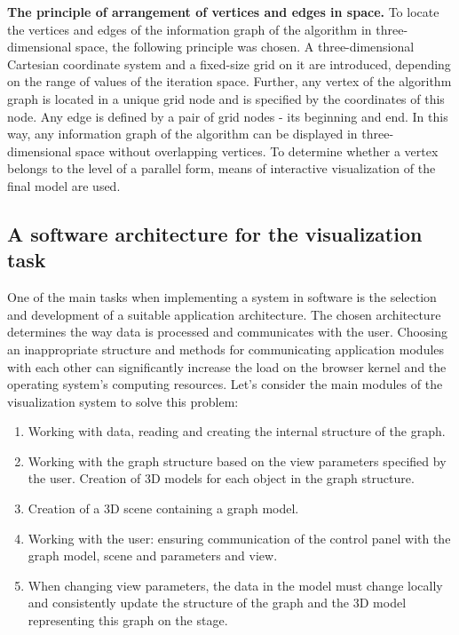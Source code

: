 \textbf{The principle of arrangement of vertices and edges in space.} To locate the vertices and edges of the information graph of the algorithm in three-dimensional space, the following principle was chosen. A three-dimensional Cartesian coordinate system and a fixed-size grid on it are introduced, depending on the range of values of the iteration space. Further, any vertex of the algorithm graph is located in a unique grid node and is specified by the coordinates of this node. Any edge is defined by a pair of grid nodes - its beginning and end. In this way, any information graph of the algorithm can be displayed in three-dimensional space without overlapping vertices. To determine whether a vertex belongs to the level of a parallel form, means of interactive visualization of the final model are used.

\subsection{A software architecture for the visualization task}

One of the main tasks when implementing a system in software is the selection and development of a suitable application architecture. The chosen architecture determines the way data is processed and communicates with the user. Choosing an inappropriate structure and methods for communicating application modules with each other can significantly increase the load on the browser kernel and the operating system's computing resources. Let's consider the main modules of the visualization system to solve this problem:

\begin{enumerate}
    \item Working with data, reading and creating the internal structure of the graph.
    \item Working with the graph structure based on the view parameters specified by the user. Creation of 3D models for each object in the graph structure.
    \item Creation of a 3D scene containing a graph model.
    \item Working with the user: ensuring communication of the control panel with the graph model, scene and parameters and view.
    \item When changing view parameters, the data in the model must change locally and consistently update the structure of the graph and the 3D model representing this graph on the stage.
\end{enumerate}

